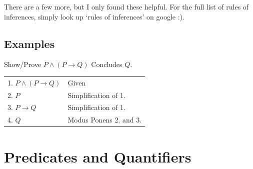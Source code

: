 \documentclass{article}
\begin{document}
{\scriptsize There are a few more, but I only found these helpful. For the full list of rules of inferences, simply look up `rules of inferences' on google :).}

\subsection{Examples}

\quad Show/Prove $P \land (P \rightarrow Q)$ Concludes $Q$.

\begin{tabular}{l|l}
1. $P \land (P \rightarrow Q)$ & Given\\
2. $P$ & Simplification of 1.\\
3. $P \rightarrow Q$ & Simplification of 1.\\
4. $Q$ & Modus Ponens 2. and 3.\\
\end{tabular}


\pagebreak

\text{}

\section{Predicates and Quantifiers}
\end{document}

